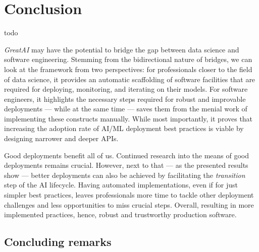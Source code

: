 \chapter{Conclusion}  \label{chapter:conclusion}

todo

\textit{GreatAI} may have the potential to bridge the gap between data science and software engineering. Stemming from the bidirectional nature of bridges, we can look at the framework from two perspectives: for professionals closer to the field of data science, it provides an automatic scaffolding of software facilities that are required for deploying, monitoring, and iterating on their models. For software engineers, it highlights the necessary steps required for robust and improvable deployments --- while at the same time --- saves them from the menial work of implementing these constructs manually. While most importantly, it proves that increasing the adoption rate of AI/ML deployment best practices is viable by designing narrower and deeper APIs.

Good deployments benefit all of us. Continued research into the means of good deployments remains crucial. However, next to that --- as the presented results show --- better deployments can also be achieved by facilitating the \textit{transition} step of the AI lifecycle. Having automated implementations, even if for just simpler best practices, leaves professionals more time to tackle other deployment challenges and less opportunities to miss crucial steps. Overall, resulting in more implemented practices, hence, robust and trustworthy production software.

\section{Concluding remarks}
